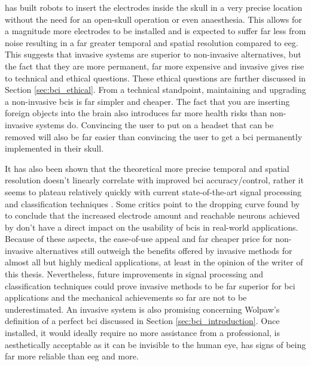 \citet{neuralink_whitepaper} has built robots to insert the electrodes inside the skull in a very precise location without the need for an open-skull operation or even anaesthesia.
This allows for a magnitude more electrodes to be installed and is expected to suffer far less from noise resulting in a far greater temporal and spatial resolution compared to \gls{eeg}.
This suggests that invasive systems are superior to non-invasive alternatives, but the fact that they are more permanent, far more expensive and invasive gives rise to technical and ethical questions.
These ethical questions are further discussed in Section \ref{sec:bci_ethical}.
From a technical standpoint, maintaining and upgrading a non-invasive \glspl{bci} is far simpler and cheaper.
The fact that you are inserting foreign objects into the brain also introduces far more health risks than non-invasive systems do.
Convincing the user to put on a headset that can be removed will also be far easier than convincing the user to get a \gls{bci} permanently implemented in their skull.

It has also been shown that the theoretical more precise temporal and spatial resolution doesn't linearly correlate with improved \gls{bci} accuracy/control, rather it seems to plateau relatively quickly with current state-of-the-art signal processing and classification techniques \citep{dropping_curve_eeg_lectrodes, more_electrodes_not_better}.
Some critics point to the dropping curve found by \citet{dropping_curve_eeg_lectrodes} to conclude that the increased electrode amount and reachable neurons achieved by \citet{neuralink_whitepaper} don't have a direct impact on the usability of \glspl{bci} in real-world applications.
Because of these aspects, the ease-of-use appeal and far cheaper price for non-invasive alternatives still outweigh the benefits offered by invasive methods for almost all but highly medical applications, at least in the opinion of the writer of this thesis.
Nevertheless, future improvements in signal processing and classification techniques could prove invasive methods to be far superior for \gls{bci} applications and the mechanical achievements so far are not to be underestimated.
An invasive system is also promising concerning Wolpaw's definition of a perfect \gls{bci} discussed in Section \ref{sec:bci_introduction}.
Once installed, it would ideally require no more assistance from a professional, is aesthetically acceptable as it can be invisible to the human eye, has signs of being far more reliable than \gls{eeg} and more.

